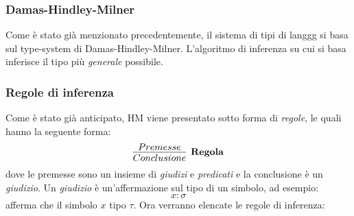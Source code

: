 \documentclass[10pt,a4paper]{article}
\begin{document}
\subsubsection{Damas-Hindley-Milner}
Come è stato già menzionato precedentemente, il sistema di tipi di langgg si basa sul type-system di Damas-Hindley-Milner.
L'algoritmo di inferenza su cui si basa inferisce il tipo più \textit{generale} possibile.

\subsubsection{Regole di inferenza}
Come è stato già anticipato, HM viene presentato sotto forma di \textit{regole}, le quali hanno la seguente forma:
\newline
\[ \infer[\textbf{Regola}]{Conclusione}{Premesse} \]
dove le premesse sono un insieme di \textit{giudizi} e \textit{predicati} e la conclusione è un \textit{giudizio}. Un
\textit{giudizio} è un'affermazione sul tipo di un simbolo, ad esempio:
\[ x : \sigma \]
afferma che il simbolo $ x $ tipo $ \tau $. Ora verranno elencate le regole di inferenza:
\end{document}
